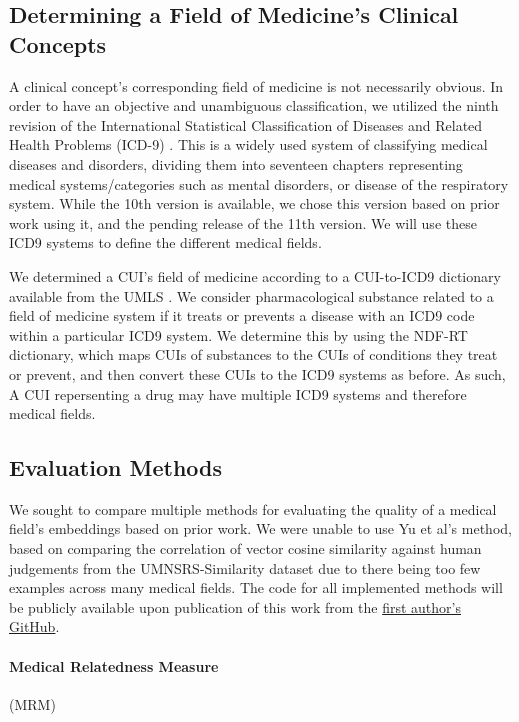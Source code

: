 \documentclass[11pt,a4paper]{article}
\begin{document}
\subsection{Determining a Field of Medicine's Clinical Concepts}
A clinical concept's corresponding field of medicine is not necessarily obvious. In order to have an objective and unambiguous classification, we utilized the ninth revision of the International Statistical Classification of Diseases and Related Health Problems (ICD-9) \cite{sleeInternationalClassificationDiseases1978}. This is a widely used system of classifying medical diseases and disorders, dividing them into seventeen chapters representing medical systems/categories such as mental disorders, or disease of the respiratory system. While the 10th version is available, we chose this version based on prior work using it, and the pending release of the 11th version. We will use these ICD9 systems to define the different medical fields. 

We determined a CUI's field of medicine according to a CUI-to-ICD9 dictionary available from the UMLS \cite{bodenreiderUnifiedMedicalLanguage2004}. We consider pharmacological substance related to a field of medicine system if it treats or prevents a disease with an ICD9 code within a particular ICD9 system. We determine this by using the NDF-RT dictionary, which maps CUIs of substances to the CUIs of conditions they treat or prevent, and then convert these CUIs to the ICD9 systems as before.  As such, A CUI repersenting a drug may have multiple ICD9 systems and therefore medical fields. 

\subsection{Evaluation Methods}

We sought to compare multiple methods for evaluating the quality of a medical field's embeddings based on prior work. We were unable to use Yu et al's  method, based on comparing the correlation of vector cosine similarity against human judgements from the UMNSRS-Similarity dataset \cite{pakhomovSemanticRelatednessSimilarity2018} due to there being too few examples across many medical fields. 
The code for all implemented methods will be publicly available upon publication of this work from the  \href{https://github.com/ANONforREVIEW}{first author's GitHub}.

\paragraph{Medical Relatedness Measure}(MRM)
\end{document}

